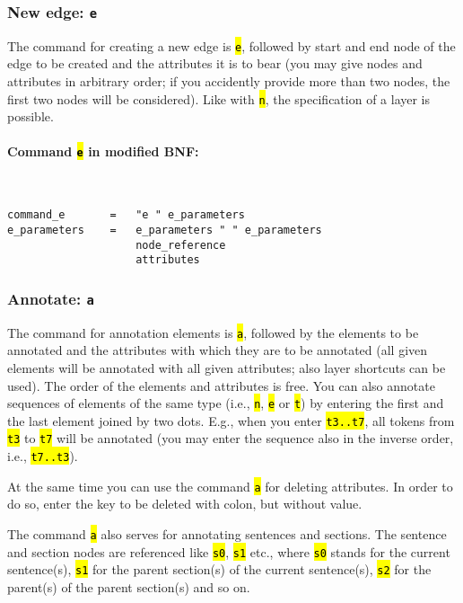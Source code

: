 \documentclass[12pt]{scrartcl}
\newcommand{\code}[1]{\hl{\texttt{#1}}}
\begin{document}
\subsubsection{New edge: \texttt{e}}

The command for creating a new edge is \code{e}, followed by start and end node of the edge to be created and the attributes it is to bear (you may give nodes and attributes in arbitrary order; if you accidently provide more than two nodes, the first two nodes will be considered).
Like with \code{n}, the specification of a layer is possible.

\paragraph*{Command \code{e} in modified BNF:}
~
\begin{lstlisting}
command_e       =   "e " e_parameters
e_parameters    =   e_parameters " " e_parameters
                    node_reference
                    attributes
\end{lstlisting}


\subsubsection{Annotate: \texttt{a}}\label{befehl-a}

The command for annotation elements is \code{a}, followed by the elements to be annotated and the attributes with which they are to be annotated (all given elements will be annotated with all given attributes; also layer shortcuts can be used).
The order of the elements and attributes is free.
You can also annotate sequences of elements of the same type (i.e., \code{n}, \code{e} or \code{t}) by entering the first and the last element joined by two dots.
E.g., when you enter \code{t3..t7}, all tokens from \code{t3} to \code{t7} will be annotated (you may enter the sequence also in the inverse order, i.e., \code{t7..t3}).

At the same time you can use the command \code{a} for deleting attributes.
In order to do so, enter the key to be deleted with colon, but without value.

The command \code{a} also serves for annotating sentences and sections.
The sentence and section nodes are referenced like \code{s0}, \code{s1} etc., where \code{s0} stands for the current sentence(s), \code{s1} for the parent section(s) of the current sentence(s), \code{s2} for the parent(s) of the parent section(s) and so on.
\end{document}

